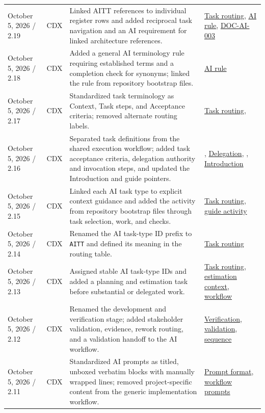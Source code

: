 \begin{tabularx}{\linewidth}{L{3.1cm}L{2.2cm}YL{2.0cm}}
October 5, 2026 / 2.19 & CDX & Linked AITT references to individual register rows and added reciprocal task navigation and an AI requirement for linked architecture references. & \hyperref[Table:AISkills]{Task routing}, \hyperref[Rule:AIReferenceLinks]{AI rule}, \hyperref[Requirement:DOCAI003]{DOC-AI-003}\\
October 5, 2026 / 2.18 & CDX & Added a general AI terminology rule requiring established terms and a completion check for synonyms; linked the rule from repository bootstrap files. & \hyperref[Rule:AITerminologyConsistency]{AI rule}\\
October 5, 2026 / 2.17 & CDX & Standardized task terminology as Context, Task steps, and Acceptance criteria; removed alternate routing labels. & \hyperref[Table:AISkills]{Task routing}, \\
October 5, 2026 / 2.16 & CDX & Separated task definitions from the shared execution workflow; added task acceptance criteria, delegation authority and invocation steps, and updated the Introduction and guide pointers. & , \hyperref[Section:AIAgentDelegation]{Delegation}, , \hyperref[Section:InitializeNewProject]{Introduction}\\
October 5, 2026 / 2.15 & CDX & Linked each AI task type to explicit context guidance and added the activity from repository bootstrap files through task selection, work, and checks. & \hyperref[Table:AISkills]{Task routing}, \hyperref[Figure:AIGuideActivity]{guide activity}\\
October 5, 2026 / 2.14 & CDX & Renamed the AI task-type ID prefix to \texttt{AITT} and defined its meaning in the routing table. & \hyperref[Table:AISkills]{Task routing}\\
October 5, 2026 / 2.13 & CDX & Assigned stable AI task-type IDs and added a planning and estimation task before substantial or delegated work. & \hyperref[Table:AISkills]{Task routing}, \hyperref[Section:AIPlanningEstimateContext]{estimation context}, \hyperref[Chapter:AIImplementationWorkflow]{workflow}\\
October 5, 2026 / 2.12 & CDX & Renamed the development and verification stage; added stakeholder validation, evidence, rework routing, and a validation handoff to the AI workflow. & \hyperref[Section:AIImplementationVerification]{Verification}, \hyperref[Section:AIImplementationValidation]{validation}, \hyperref[Figure:AIImplementationSequence]{sequence}\\
October 5, 2026 / 2.11 & CDX & Standardized AI prompts as titled, unboxed verbatim blocks with manually wrapped lines; removed project-specific content from the generic implementation workflow. & \hyperref[Section:AIPromptFormatting]{Prompt format}, \hyperref[Section:AIImplementationStart]{workflow prompts}\\

\end{tabularx}
